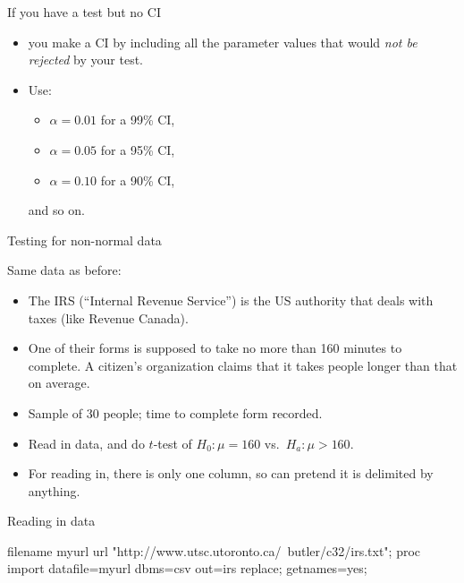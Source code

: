 \documentclass[unknownkeysallowed]{beamer}\usepackage[]{graphicx}\usepackage[]{color}
\begin{document}
\begin{frame}[fragile]{If you have a test but no CI}

  \begin{itemize}
  \item you make a CI by including all the parameter values that would
    \emph{not be rejected} by your test.
  \item Use:
    \begin{itemize}
    \item $\alpha=0.01$ for a 99\% CI,
    \item     $\alpha=0.05$ for a 95\% CI,
    \item  $\alpha=0.10$ for a 90\% CI, 
    \end{itemize}
    and so on.
  \end{itemize}
  
\end{frame}


\begin{frame}[fragile]{Testing for non-normal data}
  
  Same data as before:
  
  \begin{itemize}
  \item The IRS (``Internal Revenue Service'') is the US authority
    that deals with taxes (like Revenue Canada). 
  \item One of their forms is supposed to take no more than 160
    minutes to complete. A citizen's organization claims that it takes
    people longer than that on average.
  \item Sample of 30 people; time to complete form recorded.
  \item Read in data, and do $t$-test of $H_0: \mu=160$ vs.\
    $H_a: \mu>160$.
  \item For reading in, there is only one column, so can pretend it is
    delimited by anything.
  \end{itemize}
  
\end{frame}

\begin{frame}[fragile]{Reading in data}
  
  \begin{Datastep}
filename myurl url 
  "http://www.utsc.utoronto.ca/~butler/c32/irs.txt";    
proc import
  datafile=myurl
    dbms=csv
    out=irs
    replace;
  getnames=yes;
  \end{Datastep}
  
\end{frame}
\end{document}
